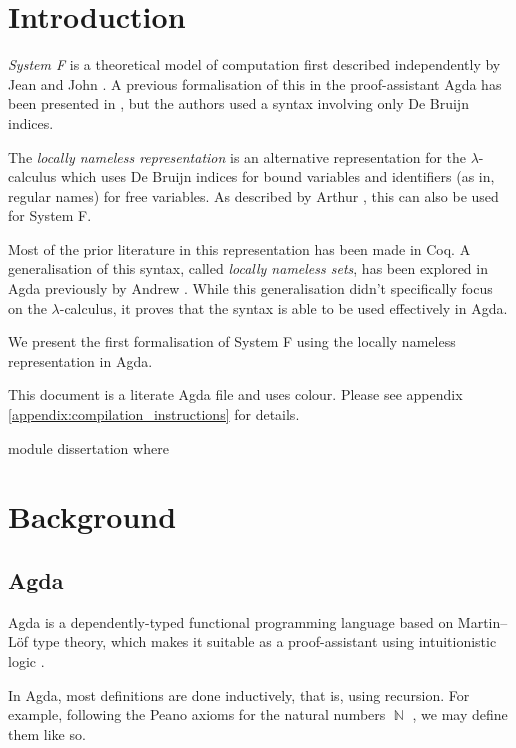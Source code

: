 \documentclass[logo,bsc,singlespacing,parskip,online]{infthesis}
\DeclareMathOperator{\nat}{\mathbb{N}}
\renewenvironment{code}{\mintedcopy[breaklines,breaksymbolleft=\;]{agda}}{\endmintedcopy}
\begin{document}
\chapter{Introduction}

\textit{System F} is a theoretical model of computation first described independently by
Jean \citet{girard_interpretation_1972} and John \citet{goos_towards_1974}. A previous formalisation of this
in the proof-assistant Agda has been presented in \citep{hutton_system_2019}, but the authors used a
syntax involving only De Bruijn indices.

The \textit{locally nameless representation} is an alternative representation for the
$\lambda$-calculus which uses De Bruijn indices for bound variables and identifiers (as in, regular
names) for free variables. As described by Arthur \citet{chargueraud_locally_2012}, this can also be
used for System F.

Most of the prior literature in this representation has been made in Coq. A generalisation of this
syntax, called \textit{locally nameless sets}, has been explored in Agda previously by Andrew
\citet{pitts_locally_2023}. While this generalisation didn't specifically focus on the
$\lambda$-calculus, it proves that the syntax is able to be used effectively in Agda.

We present the first formalisation of System F using the locally nameless representation in Agda.

This document is a literate Agda file and uses {\color{violet}colour}. Please see appendix
\ref{appendix:compilation_instructions} for details.

\begin{code}
module dissertation where
\end{code}

\chapter{Background}

\section{Agda}
Agda is a dependently-typed functional programming language based on Martin--Löf type theory, which
makes it suitable as a proof-assistant using intuitionistic logic \citep{norell_towards_2007}.

In Agda, most definitions are done inductively, that is, using recursion. For example, following the
Peano axioms for the natural numbers $\nat$ \citep{boolos_freges_1995}, we may define them like so.
\end{document}
